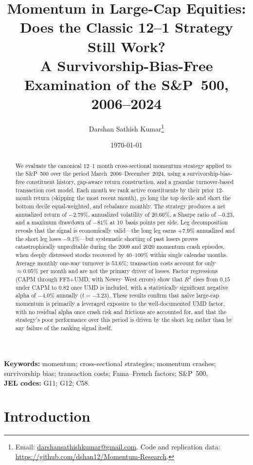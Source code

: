 \documentclass[11pt]{article}
\title{\large\textbf{Momentum in Large-Cap Equities:\\
Does the Classic 12--1 Strategy Still Work?}\\[0.5em]
\normalsize A Survivorship-Bias-Free Examination of the S\&P~500, 2006--2024}
\author{%
  Darshan Sathish Kumar\thanks{%
    Email: \href{mailto:darshansathishkumar@gmail.com}{darshansathishkumar@gmail.com}.
    Code and replication data: \url{https://github.com/dshan12/Momentum-Research}.
  }
}
\date{\today}
\begin{document}
\maketitle

\begin{abstract}
\noindent
We evaluate the canonical 12--1 month cross-sectional momentum strategy applied to the
S\&P~500 over the period March~2006--December~2024, using a survivorship-bias-free
constituent history, gap-aware return construction, and a granular turnover-based
transaction cost model. Each month we rank active constituents by their prior 12-month
return (skipping the most recent month), go long the top decile and short the bottom
decile equal-weighted, and rebalance monthly. The strategy produces a net annualized
return of $-2.79\%$, annualized volatility of $20.66\%$, a Sharpe ratio of $-0.23$,
and a maximum drawdown of $-81\%$ at 10~basis points per side. Leg decomposition
reveals that the signal is economically valid---the long leg earns $+7.9\%$ annualized
and the short leg loses $-9.1\%$---but systematic shorting of past losers proves
catastrophically unprofitable during the 2009 and 2020 momentum crash episodes, when
deeply distressed stocks recovered by $40$--$100\%$ within single calendar months.
Average monthly one-way turnover is $53.6\%$; transaction costs account for only
$\approx0.05\%$ per month and are not the primary driver of losses. Factor regressions
(CAPM through FF5$+$UMD, with Newey--West errors) show that $R^2$ rises from $0.15$
under CAPM to $0.82$ once UMD is included, with a statistically significant negative
alpha of $-4.0\%$ annually ($t = -3.23$). These results confirm that na\"ive large-cap
momentum is primarily a leveraged exposure to the well-documented UMD factor, with no
residual alpha once crash risk and frictions are accounted for, and that the strategy's
poor performance over this period is driven by the short leg rather than by any failure
of the ranking signal itself.
\end{abstract}

\noindent\textbf{Keywords:} momentum; cross-sectional strategies; momentum crashes;
survivorship bias; transaction costs; Fama--French factors; S\&P~500.\\
\textbf{JEL codes:} G11; G12; C58.

\section{Introduction}
\end{document}

